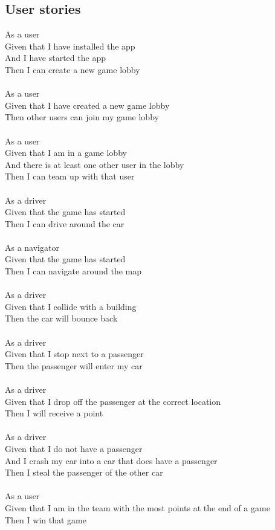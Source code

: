 \documentclass{article}
\begin{document}
\subsection{User stories}
As a user\\
Given that I have installed the app\\
And I have started the app\\
Then I can create a new game lobby\\\\
As a user\\
Given that I have created a new game lobby\\
Then other users can join my game lobby\\\\
As a  user\\
Given that I am in a game lobby\\
And there is at least one other user in the lobby\\
Then I can team up with that user\\\\
As a driver\\
Given that the game has started\\
Then I can drive around the car\\\\
As a navigator\\
Given that the game has started\\
Then I can navigate around the map\\\\
As a driver\\
Given that I collide with a building\\
Then the car will bounce back\\\\
As a driver\\
Given that I stop next to a passenger\\
Then the passenger will enter my car\\\\
As a driver\\
Given that I drop off the passenger at the correct location\\
Then I will receive a point\\\\
As a driver\\
Given that I do not have a passenger\\
And I crash my car into a car that does have a passenger\\
Then I steal the passenger of the other car\\\\
As a user\\
Given that I am in the team with the most points at the end of a game\\
Then I win that game\\\\
\end{document}
